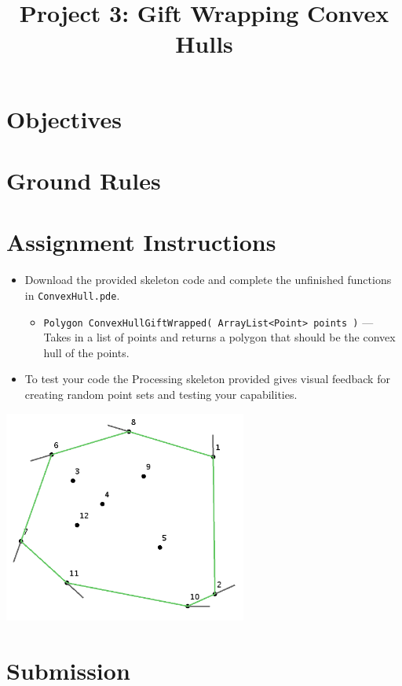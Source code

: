 \documentclass[a4paper,12pt]{article}
\title{Project 3: Gift Wrapping Convex Hulls}
\begin{document}
\maketitle

\section{Objectives}



\vspace{5pt}
\section{Ground Rules}


\vspace{5pt}
\section{Assignment Instructions}

\begin{itemize}

\item Download the provided skeleton code and complete the unfinished functions in \texttt{ConvexHull.pde}.

\begin{itemize}

   \item \texttt{Polygon ConvexHullGiftWrapped( ArrayList<Point> points )} --- Takes in a list of points and returns a polygon that should be the convex hull of the points.
   
\end{itemize}

\item To test your code the Processing skeleton provided gives visual feedback for creating random point sets and testing your capabilities.

\end{itemize}

\begin{center}
\includegraphics[width=8cm]{../images/project3.png}
\end{center}

\section{Submission}

\end{document}

